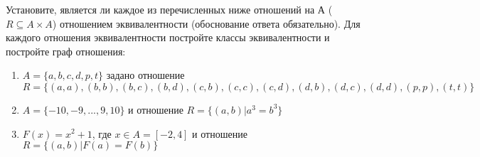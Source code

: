 \question
Установите, является ли каждое из перечисленных ниже отношений на А ($R \subseteq A \times A$) отношением эквивалентности (обоснование ответа обязательно). Для каждого отношения эквивалентности постройте классы 
эквивалентности и постройте граф отношения:
\begin{enumerate}
	\renewcommand{\labelenumi}{\alph{enumi})}
	\item $A = \{a, b, c, d, p, t\}$ задано отношение $R = \{(a, a), (b, b), (b, c), (b, d), (c, b), (c, c), (c, d), (d, b), (d, c), (d, d), (p,p), (t,t)\}$
	\item $A = \{-10, -9, ..., 9, 10\}$ и отношение $R = \{(a,b)|a^{3} = b^{3}\}$
	\item $F(x)=x^{2}+1$, где $x \in A = [-2, 4]$ и отношение $R = \{(a,b)|F(a) = F(b)\}$
\end{enumerate}
